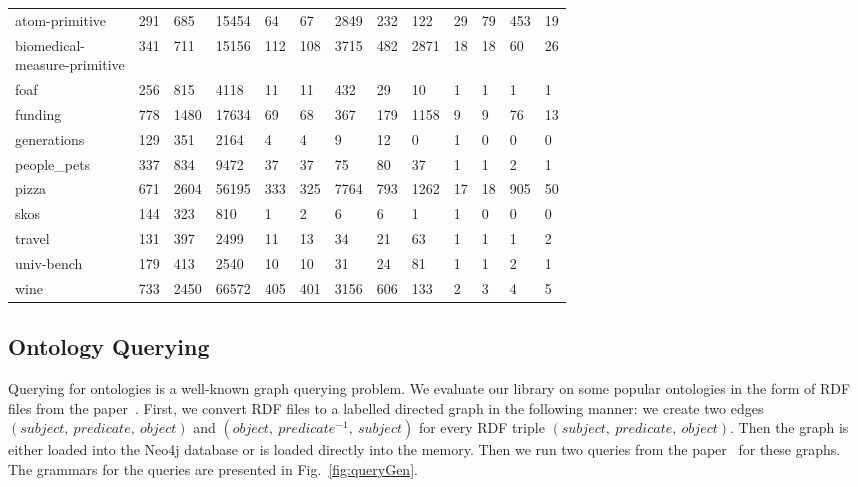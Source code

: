 \begin{table*}[t]
\begin{tabular}{|l|ll|lllll|lllll|}
\hline\hline
atom-primitive              & 291 & 685  & 15454 & 64  & 67 & 2849 & 232 & 122  &  29 &  79 & 453 & 19 \\
\shortstack[l]{biomedical- \\
 measure-primitive}         & 341 & 711  & 15156 & 112 & 108 & 3715 & 482 & 2871 &  18 & 18 & 60  & 26 \\
foaf                        & 256 & 815  & 4118  & 11  & 11  & 432  & 29  & 10   &  1  & 1  & 1   & 1 \\
funding                     & 778 & 1480 & 17634 & 69  & 68  & 367  & 179 & 1158 &  9  & 9   & 76  & 13 \\
generations                 & 129 & 351  & 2164  & 4   & 4   & 9    & 12  & 0    &  1  & 0  & 0   & 0 \\
people\_pets                & 337 & 834  & 9472  & 37  & 37  & 75   & 80  & 37   &  1  & 1  & 2   & 1 \\
pizza                       & 671 & 2604 & 56195 & 333 & 325 & 7764 & 793 & 1262 &  17 & 18 & 905 & 50 \\
skos                        & 144 & 323  & 810   & 1   & 2   & 6    & 6   & 1    &  1  & 0  & 0   & 0 \\
travel                      & 131 & 397  & 2499  & 11  & 13  & 34   & 21  & 63   &  1  & 1  & 1   & 2 \\
univ-bench                  & 179 & 413  & 2540  & 10  & 10  & 31   & 24  & 81   &  1  & 1  & 2   & 1 \\
wine                        & 733 & 2450 & 66572 & 405 & 401 & 3156 & 606 & 133  &  2  & 3  & 4   & 5 \\
\hline
\end{tabular}
\end{table*}


\subsection{Ontology Querying}
\label{sec:ontology}

Querying for ontologies is a well-known graph querying problem. We evaluate our library on some popular ontologies in the form of RDF files from the paper~\cite{CFGonRDF}.
First, we convert RDF files to a labelled directed graph in the following manner: we create two edges $(subject,\ predicate,\ object)$ and $(object,\ predicate^{-1},\ subject)$ for every RDF triple $(subject,\ predicate,\ object)$. Then the graph is either loaded into the Neo4j database or is loaded directly into the memory.
Then we run two queries from the paper~\cite{GrigorevR16} for these graphs. The grammars for the queries are presented in Fig.~\ref{fig:queryGen}.

